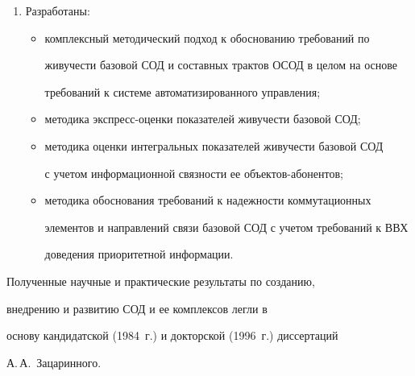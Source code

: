 \begin{enumerate}[1.]
\begin{itemize}
сис\-темы;\\[-15pt]


\item методики оценки эффективности сис\-те\-мы протоколов 


информационного обмена.\\[-15pt]


\end{itemize}


     \item Разработаны:\\[-15pt]


     \begin{itemize}


\item комплексный методический подход к обоснованию требований по 


живучести базовой СОД и составных трактов ОСОД в целом на основе 


требований к сис\-те\-ме автоматизированного управления;\\[-15pt]


\item методика экспресс-оценки показателей живучести базовой СОД;\\[-15pt]


\item методика оценки интегральных показателей живучести базовой СОД 


с учетом информационной связности ее объек\-тов-або\-нен\-тов;\\[-15pt]


\item методика обоснования требований к надежности коммутационных 


элементов и направлений связи базовой СОД с учетом требований к ВВХ 


доведения приоритетной информации.\\[-15pt]


\end{itemize}


\end{enumerate}





    Полученные научные и практические результаты по созданию, 


внедрению и развитию СОД и ее комплексов легли в 


основу кандидатской (1984~г.) и докторской (1996~г.) диссертаций


А.\,А.~Зацаринного.






